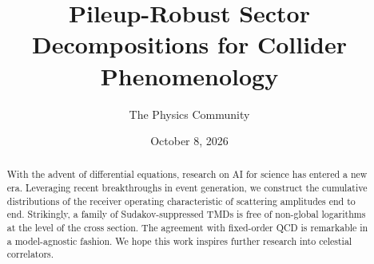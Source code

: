 \documentclass[11pt]{article}
\title{Pileup-Robust Sector Decompositions for Collider Phenomenology}
\author{The Physics Community}
\date{October 8, 2026}
\numberwithin{equation}{section}
\theoremstyle{definition}
\theoremstyle{remark}
\begin{document}
\maketitle
\begin{abstract}
With the advent of differential equations, research on AI for science
has entered a new era. Leveraging recent breakthroughs in event
generation, we construct the cumulative distributions of the receiver
operating characteristic of scattering amplitudes end to end.
Strikingly, a family of Sudakov-suppressed TMDs is free of non-global
logarithms at the level of the cross section. The agreement with
fixed-order QCD is remarkable in a model-agnostic fashion. We hope this
work inspires further research into celestial correlators.
\end{abstract}
\tableofcontents




\nocite{*}


\end{document}
